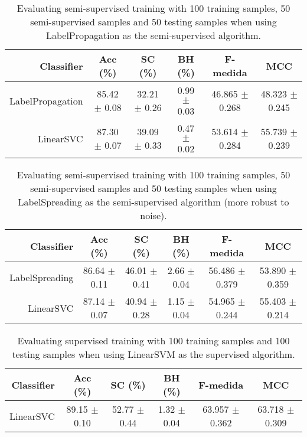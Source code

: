 \begin{table}[!htb]
\footnotesize
\centering
\caption{Evaluating semi-supervised training with 100 training samples, 50 semi-supervised samples and 50 testing samples when using LabelPropagation as the semi-supervised algorithm.}
\label{tab:label-propagation}
\begin{tabular}{r|c|c|c|c|c} \hline\hline
Classifier & Acc (\%) & SC (\%) & BH (\%) & F-medida & MCC \\ \hline
LabelPropagation & 85.42 $\pm$ 0.08 & 32.21 $\pm$ 0.26 & 0.99 $\pm$ 0.03 & 46.865 $\pm$ 0.268 & 48.323 $\pm$ 0.245 \\
LinearSVC & 87.30 $\pm$ 0.07 & 39.09 $\pm$ 0.33 & 0.47 $\pm$ 0.02 & 53.614 $\pm$ 0.284 & 55.739 $\pm$ 0.239 \\
\hline\hline
\end{tabular}
\end{table}
\begin{table}[!htb]
\footnotesize
\centering
\caption{Evaluating semi-supervised training with 100 training samples, 50 semi-supervised samples and 50 testing samples when using LabelSpreading as the semi-supervised algorithm (more robust to noise).}
\label{tab:label-spreading}
\begin{tabular}{r|c|c|c|c|c} \hline\hline
Classifier & Acc (\%) & SC (\%) & BH (\%) & F-medida & MCC \\ \hline
LabelSpreading & 86.64 $\pm$ 0.11 & 46.01 $\pm$ 0.41 & 2.66 $\pm$ 0.04 & 56.486 $\pm$ 0.379 & 53.890 $\pm$ 0.359 \\
LinearSVC & 87.14 $\pm$ 0.07 & 40.94 $\pm$ 0.28 & 1.15 $\pm$ 0.04 & 54.965 $\pm$ 0.244 & 55.403 $\pm$ 0.214 \\
\hline\hline
\end{tabular}
\end{table}
\begin{table}[!htb]
\footnotesize
\centering
\caption{Evaluating supervised training with 100 training samples and 100 testing samples when using LinearSVM as the supervised algorithm.}
\label{tab:linear-svm}
\begin{tabular}{r|c|c|c|c|c} \hline\hline
Classifier & Acc (\%) & SC (\%) & BH (\%) & F-medida & MCC \\ \hline
LinearSVC & 89.15 $\pm$ 0.10 & 52.77 $\pm$ 0.44 & 1.32 $\pm$ 0.04 & 63.957 $\pm$ 0.362 & 63.718 $\pm$ 0.309 \\
\hline\hline
\end{tabular}
\end{table}
